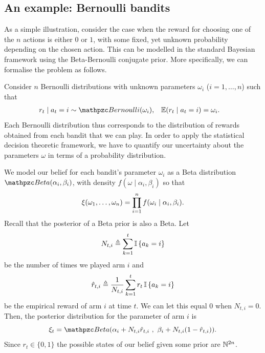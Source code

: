 \subsection{An example: Bernoulli bandits}
\label{sec:bernoulli-bandit-example}
As a simple illustration, consider the case when the reward for choosing one of the $n$ actions is either $0$ or $1$, with some fixed, yet unknown probability depending on the chosen action. This can be modelled in the standard Bayesian framework using the Beta-Bernoulli conjugate prior. More specifically, we can formalise the problem as follows.

Consider $n$ Bernoulli distributions with
unknown parameters $\omega_i$ ($i = 1, \ldots, n$) such that 
\begin{align}
  r_t \mid a_t = i &\sim
  \Bernoulli(\omega_i),
  &
  \E(r_t  \mid a_t = i) &= \omega_i.
\end{align}
Each Bernoulli distribution thus corresponds to the distribution of
rewards obtained from each bandit that we can play.  In order to
apply the statistical decision theoretic framework, we have to
quantify our uncertainty about the parameters $\omega$ in terms of a
probability distribution.

We model our belief for each bandit's
parameter $\omega_i$ as a Beta distribution $\BetaDist(\alpha_i,
\beta_i)$, with density $f(\omega \mid \alpha_i, \beta_i)$ so that
\[
\xi(\omega_1, \ldots, \omega_n)
=
\prod_{i=1}^n f(\omega_i \mid \alpha_i, \beta_i).
\]
Recall that the posterior of a Beta prior is also a Beta. Let
\[
N_{t,i} \mathrel{\triangleq} \sum_{k=1}^t \mathop{\mbox{\ensuremath{\mathbb{I}}}}\left\{a_k = i\right\}
\]
be the number of times we played arm $i$ and
\[
\hat{r}_{t,i} \mathrel{\triangleq} \frac{1}{N_{t,i}} \sum_{k=1}^t r_t \mathop{\mbox{\ensuremath{\mathbb{I}}}}\left\{a_k = i\right\}
\]
be the
\alert{empirical reward} of arm $i$ at time $t$. We
can let this equal $0$ when $N_{t,i} = 0$.
Then, the posterior distribution for the parameter of arm $i$ is
\[
\bel_t = \BetaDist(\alpha_i + N_{t,i} \hat{r}_{t,i}~,~ \beta_i + N_{t,i} (1 - \hat{r}_{t,i})).
\]
Since $r_t \in \{0,1\}$ the possible states of our belief given some
prior are ${\mathbb{N}}^{2n}$.

